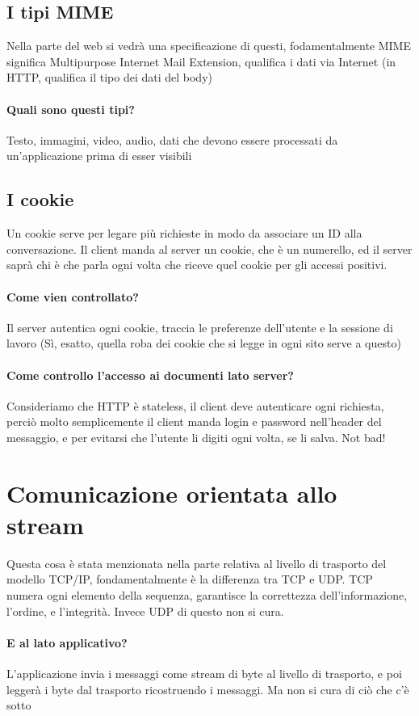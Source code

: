 \documentclass[12pt, a4paper, openany, twoside]{book}
\begin{document}
\subsection{I tipi MIME}
Nella parte del web si vedrà una specificazione di questi, fodamentalmente 
MIME significa Multipurpose Internet Mail Extension, qualifica i dati
via Internet (in HTTP, qualifica il tipo dei dati del body)
\paragraph{Quali sono questi tipi? }Testo, immagini, video, audio, dati che devono
essere processati da un'applicazione prima di esser visibili
\subsection{I cookie}
Un cookie serve per legare più richieste in modo da associare un ID alla conversazione.
Il client manda al server un cookie, che è un numerello, ed il server saprà
chi è che parla ogni volta che riceve quel cookie per gli accessi positivi.
\paragraph{Come vien controllato? }Il server autentica ogni cookie, traccia
le preferenze dell'utente e la sessione di lavoro (Sì, esatto, quella roba dei
cookie che si legge in ogni sito serve a questo)
\paragraph{Come controllo l'accesso ai documenti lato server?} Consideriamo che
HTTP è stateless, il client deve autenticare ogni richiesta, perciò molto
semplicemente il client manda login e password nell'header del messaggio, e 
per evitarsi che l'utente li digiti ogni volta, se li salva. Not bad!
\section{Comunicazione orientata allo stream}
Questa cosa è stata menzionata nella parte relativa al livello di trasporto
del modello TCP/IP, fondamentalmente è la differenza tra TCP e UDP. TCP numera
ogni elemento della sequenza, garantisce la correttezza dell'informazione, 
l'ordine, e l'integrità. Invece UDP di questo non si cura.
\paragraph{E al lato applicativo? } L'applicazione invia i messaggi come stream 
di byte al livello di trasporto, e poi leggerà i byte dal trasporto ricostruendo
i messaggi. Ma non si cura di ciò che c'è sotto
\end{document}
